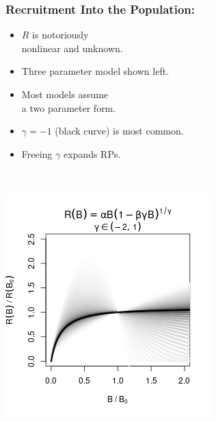 \documentclass[a0paper,portrait]{baposter}
\begin{document}
\begin{poster}
{\begin{minipage}[h!]{0.55\textwidth}
	\subsubsection*{Recruitment Into the Population:}
        \begin{minipage}[b]{0.5\textwidth}
        \begin{itemize}[leftmargin=*]
		\raggedright
		\item $R$ is notoriously\\ nonlinear and unknown.
		\item Three parameter model shown left.
		\item Most models assume\\ a two parameter form. %
		\item $\gamma=-1$ (black curve) is most common.%
		\item Freeing $\gamma$ expands RPs. %
	\end{itemize}
	$~$\\
	\end{minipage}
	\begin{minipage}[b]{0.48\textwidth}
		\includegraphics[width=\textwidth]{../../ddBias/g3Grey.png}

\end{minipage}
\end{minipage}}
\end{poster}
\end{document}
